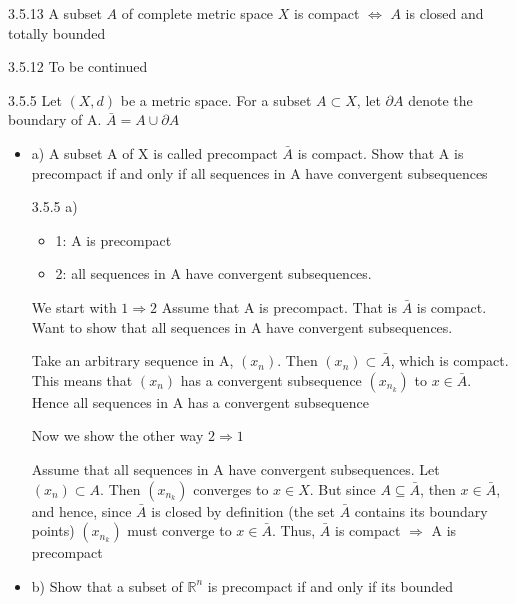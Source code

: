 \documentclass[a4paper,norsk]{article}
\begin{document}
\begin{theorembox}{3.5.13}{}
A subset $ A $ of complete metric space $ X $ is compact $ \iff $ $ A  $ is closed and totally bounded

\begin{proofbox}{3.5.12}{}
  To be continued
\end{proofbox}
\end{theorembox}


\begin{oppgavebox}{3.5.5 }{}
Let $ \left( X, d \right)  $ be a metric space. For a subset $ A \subset X $, let $ \partial A $ denote the boundary of A. $ \bar{A} = A \cup \partial A $ 

\begin{itemize}
  \item a) A subset A of X is called precompact $ \bar{A} $ is compact. Show that A is precompact if and only if all sequences in A have convergent subsequences
  
  \begin{proofbox}{3.5.5 a)}{}

    \begin{itemize}
      \item 1: A is precompact
      \item 2: all sequences in A have convergent subsequences.
    \end{itemize}

    We start with $ 1 \Rightarrow 2 $ 
    Assume that A is precompact. That is $ \bar{A} $ is compact. Want to show that all sequences in A have convergent subsequences. 

    Take an arbitrary sequence in A, $ \left( x_n \right)  $. Then $ \left( x_n \right) \subset \bar{A} $, which is compact. This means that $ \left( x_n \right)  $ has a convergent subsequence $ \left( x_{n_k} \right)  $ to $ x \in  \bar{A} $. Hence all sequences in A has a convergent subsequence


    Now we show the other way $ 2 \Rightarrow 1 $

    Assume that all sequences in A have convergent subsequences. Let $ \left( x_n \right) \subset A $. Then $ \left( x_{n_k} \right)  $ converges to $ x \in  X $. But since $ A \subseteq \bar{A} $, then $ x \in \bar{A} $, and hence, since $ \bar{A} $ is closed by definition (the set $\bar{A}$ contains its boundary points) $\left( x_{n_k} \right)  $ must converge to $ x \in \bar{A} $. Thus, $ \bar{A} $ is compact $\Rightarrow$ A is precompact 
  \end{proofbox}
  \item b) Show that a subset of $ \mathbb{R}^n $ is precompact if and only if its bounded
  

\end{itemize}
\end{oppgavebox}
\end{document}
